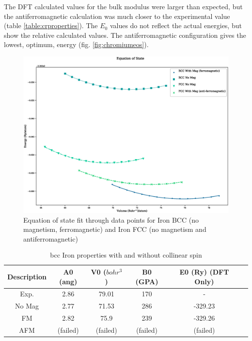 The DFT calculated values for the bulk modulus were larger than expected, but the antiferromagnetic calculation was much closer to the experimental value (table \ref{table:crproperties}).  The $E_0$ values do not reflect the actual energies, but show the relative calculated values.  The antiferromagnetic configuration gives the lowest, optimum, energy (fig. \ref{fig:chromiumeos}).

\FloatBarrier
\begin{figure}[h]
\begin{center}
\includegraphics[scale=0.45]{chapters/potentials_fe_pd_ru/qeeos_plots/fe-mag/iron_eos_comparison.eps}
\caption{Equation of state fit through data points for Iron BCC (no magnetism, ferromagnetic) and Iron FCC (no magnetism and antiferromagnetic)}
\end{center}
\label{fig:iron_bcc_fcc_eos}
\end{figure}
\FloatBarrier


\begin{table}[h]
\begin{center}
\renewcommand{\arraystretch}{1.2}
\begin{tabular}{c c c c c c}
\hline\hline
Description & A0 (ang) & V0 ($bohr^3$) & B0 (GPA) & E0 (Ry) (DFT Only) \\
\hline\hline
Exp. & 2.86 & 79.01 & 170 & - \\
No Mag & 2.77 & 71.53 & 286 & -329.23 \\
FM & 2.82 & 75.9 & 239 & -329.26 \\
AFM & (failed) & (failed) & (failed) & (failed) \\
\hline\hline
\end{tabular}
\end{center}
\caption{\acrshort{bcc} Iron properties with and without collinear spin}
\label{table:feproperties}
\end{table}

